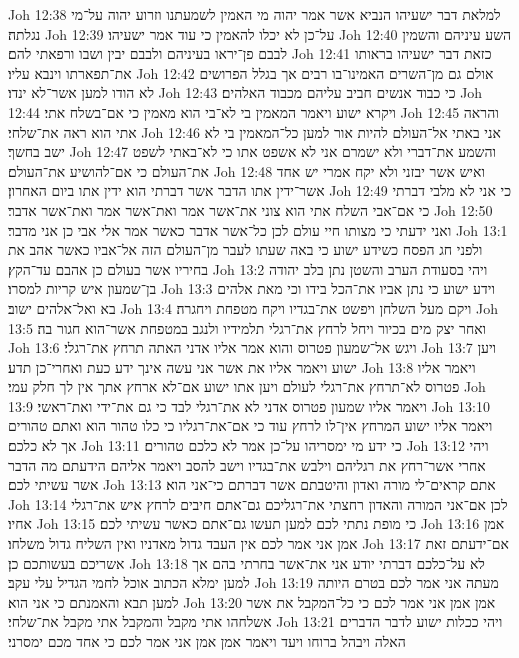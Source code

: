 Joh 12:38  למלאת דבר ישעיהו הנביא אשר אמר יהוה מי האמין לשמעתנו וזרוע יהוה על־מי נגלתה׃
Joh 12:39  על־כן לא יכלו להאמין כי עוד אמר ישעיהו׃
Joh 12:40  השע עיניהם והשמין לבבם פן־יראו בעיניהם ולבבם יבין ושבו ורפאתי להם׃
Joh 12:41  כזאת דבר ישעיהו בראותו את־תפארתו וינבא עליו׃
Joh 12:42  אולם גם מן־השרים האמינו־בו רבים אך בגלל הפרושים לא הודו למען אשר־לא ינדו׃
Joh 12:43  כי כבוד אנשים חביב עליהם מכבוד האלהים׃
Joh 12:44  ויקרא ישוע ויאמר המאמין בי לא־בי הוא מאמין כי אם־בשלח אתי׃
Joh 12:45  והראה אתי הוא ראה את־שלחי׃
Joh 12:46  אני באתי אל־העולם להיות אור למען כל־המאמין בי לא ישב בחשך׃
Joh 12:47  והשמע את־דברי ולא ישמרם אני לא אשפט אתו כי לא־באתי לשפט את־העולם כי אם־להושיע את־העולם׃
Joh 12:48  ואיש אשר יבזני ולא יקח אמרי יש אחד אשר־ידין אתו הדבר אשר דברתי הוא ידין אתו ביום האחרון׃
Joh 12:49  כי אני לא מלבי דברתי כי אם־אבי השלח אתי הוא צוני את־אשר אמר ואת־אשר אמר ואת־אשר אדבר׃
Joh 12:50  ואני ידעתי כי מצותו חיי עולם לכן כל־אשר אדבר כאשר אמר אלי אבי כן אני מדבר׃
Joh 13:1  ולפני חג הפסח כשידע ישוע כי באה שעתו לעבר מן־העולם הזה אל־אביו כאשר אהב את בחיריו אשר בעולם כן אהבם עד־הקץ׃
Joh 13:2  ויהי בסעודת הערב והשטן נתן בלב יהודה בן־שמעון איש קריות למסרו׃
Joh 13:3  וידע ישוע כי נתן אביו את־הכל בידו וכי מאת אלהים בא ואל־אלהים ישוב׃
Joh 13:4  ויקם מעל השלחן ויפשט את־בגדיו ויקח מטפחת ויחגרה׃
Joh 13:5  ואחר יצק מים בכיור ויחל לרחץ את־רגלי תלמידיו ולנגב במטפחת אשר־הוא חגור בה׃
Joh 13:6  ויגש אל־שמעון פטרוס והוא אמר אליו אדני האתה תרחץ את־רגלי׃
Joh 13:7  ויען ישוע ויאמר אליו את אשר אני עשה אינך ידע כעת ואחרי־כן תדע׃
Joh 13:8  ויאמר אליו פטרוס לא־תרחץ את־רגלי לעולם ויען אתו ישוע אם־לא ארחץ אתך אין לך חלק עמי׃
Joh 13:9  ויאמר אליו שמעון פטרוס אדני לא את־רגלי לבד כי גם את־ידי ואת־ראשי׃
Joh 13:10  ויאמר אליו ישוע המרחץ אין־לו לרחץ עוד כי אם־את־רגליו כי כלו טהור הוא ואתם טהורים אך לא כלכם׃
Joh 13:11  כי ידע מי ימסריהו על־כן אמר לא כלכם טהורים׃
Joh 13:12  ויהי אחרי אשר־רחץ את רגליהם וילבש את־בגדיו וישב להסב ויאמר אליהם הידעתם מה הדבר אשר עשיתי לכם׃
Joh 13:13  אתם קראים־לי מורה ואדון והיטבתם אשר דברתם כי־אני הוא׃
Joh 13:14  לכן אם־אני המורה והאדון רחצתי את־רגליכם גם־אתם חיבים לרחץ איש את־רגלי אחיו׃
Joh 13:15  כי מופת נתתי לכם למען תעשו גם־אתם כאשר עשיתי לכם׃
Joh 13:16  אמן אמן אני אמר לכם אין העבד גדול מאדניו ואין השליח גדול משלחו׃
Joh 13:17  אם־ידעתם זאת אשריכם בעשותכם כן׃
Joh 13:18  לא על־כלכם דברתי יודע אני את־אשר בחרתי בהם אך למען ימלא הכתוב אוכל לחמי הגדיל עלי עקב׃
Joh 13:19  מעתה אני אמר לכם בטרם היותה למען תבא והאמנתם כי אני הוא׃
Joh 13:20  אמן אמן אני אמר לכם כי כל־המקבל את אשר אשלחהו אתי מקבל והמקבל אתי מקבל את־שלחי׃
Joh 13:21  ויהי ככלות ישוע לדבר הדברים האלה ויבהל ברוחו ויעד ויאמר אמן אמן אני אמר לכם כי אחד מכם ימסרני׃
